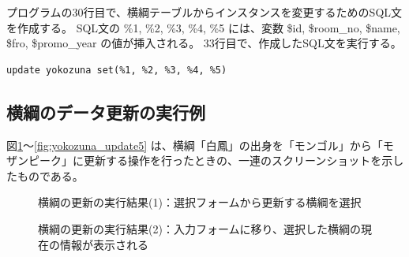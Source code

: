 \documentclass[10pt,a4paper,titlepage]{jreport}
\begin{document}
プログラムの30行目で、横綱テーブルからインスタンスを変更するためのSQL文を作成する。
SQL文の \%1, \%2, \%3, \%4, \%5 には、変数 \$id, \$room\_no, \$name, \$fro, \$promo\_year の値が挿入される。
33行目で、作成したSQL文を実行する。\\

\begin{lstlisting}[caption=横綱の更新のためのSQL]
	update yokozuna set(%1, %2, %3, %4, %5)
\end{lstlisting}
\vspace{3mm}


\subsection{横綱のデータ更新の実行例}

図\ref{fig:yokozuna_update1}～\ref{fig:yokozuna_update5} は、横綱「白鳳」の出身を「モンゴル」から「モザンピーク」に更新する操作を行ったときの、一連のスクリーンショットを示したものである。

\begin{figure}[h]
	\begin{center}
	\end{center}
	\caption{横綱の更新の実行結果(1)：選択フォームから更新する横綱を選択
	}
	\label{fig:yokozuna_update1}
\end{figure}

\begin{figure}[h]
	\begin{center}
	\end{center}
	\caption{横綱の更新の実行結果(2)：入力フォームに移り、選択した横綱の現在の情報が表示される
	}
	\label{fig:yokozuna_update2}
\end{figure}
\end{document}
